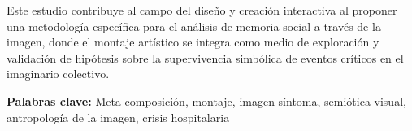 Este estudio contribuye al campo del diseño y creación interactiva al proponer una metodología específica para el análisis de memoria social a través de la imagen, donde el montaje artístico se integra como medio de exploración y validación de hipótesis sobre la supervivencia simbólica de eventos críticos en el imaginario colectivo.

\vspace{1cm}
\textbf{Palabras clave:} \textcolor{edit30sept}{Meta-composición, montaje, imagen-síntoma, semiótica visual, antropología de la imagen, crisis hospitalaria}   
\pagebreak
